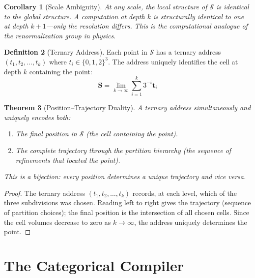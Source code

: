 \documentclass[twocolumn,10pt,a4paper]{article}
\theoremstyle{plain}
\newtheorem{theorem}{Theorem}[section]
\newtheorem{corollary}[theorem]{Corollary}
\theoremstyle{definition}
\newtheorem{definition}[theorem]{Definition}
\theoremstyle{remark}
\newcommand{\Sspace}{\mathcal{S}}
\newcommand{\Scoord}{\mathbf{S}}
\begin{document}
\begin{corollary}[Scale Ambiguity]
At any scale, the local structure of $\Sspace$ is identical to the global structure. A computation at depth $k$ is structurally identical to one at depth $k+1$---only the resolution differs. This is the computational analogue of the renormalization group in physics.
\end{corollary}

\begin{definition}[Ternary Address]
\label{def:ternary_addr}
Each point in $\Sspace$ has a ternary address $(t_1, t_2, \ldots, t_k)$ where $t_i \in \{0, 1, 2\}^3$. The address uniquely identifies the cell at depth $k$ containing the point:
\begin{equation}
    \Scoord = \lim_{k \to \infty} \sum_{i=1}^{k} 3^{-i} \mathbf{t}_i
\end{equation}
\end{definition}

\begin{theorem}[Position--Trajectory Duality]
\label{thm:pos_traj}
A ternary address simultaneously and uniquely encodes both:
\begin{enumerate}
    \item The \emph{final position} in $\Sspace$ (the cell containing the point).
    \item The \emph{complete trajectory} through the partition hierarchy (the sequence of refinements that located the point).
\end{enumerate}
This is a bijection: every position determines a unique trajectory and vice versa.
\end{theorem}

\begin{proof}
The ternary address $(t_1, t_2, \ldots, t_k)$ records, at each level, which of the three subdivisions was chosen. Reading left to right gives the trajectory (sequence of partition choices); the final position is the intersection of all chosen cells. Since the cell volumes decrease to zero as $k \to \infty$, the address uniquely determines the point.
\end{proof}

\section{The Categorical Compiler}
\label{sec:compiler}
\end{document}
